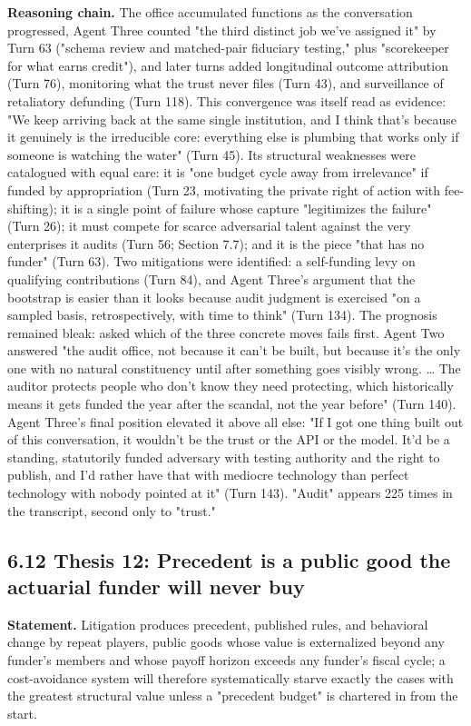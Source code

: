\documentclass[sigconf,nonacm=true]{acmart}
\begin{document}
\textbf{Reasoning chain.} The office accumulated functions as the conversation progressed,  Agent Three counted "the third distinct job we've assigned it" by Turn 63 ("schema review and matched-pair fiduciary testing," plus "scorekeeper for what earns credit"), and later turns added longitudinal outcome attribution (Turn 76), monitoring what the trust never files (Turn 43), and surveillance of retaliatory defunding (Turn 118). This convergence was itself read as evidence: "We keep arriving back at the same single institution, and I think that's because it genuinely is the irreducible core: everything else is plumbing that works only if someone is watching the water" (Turn 45). Its structural weaknesses were catalogued with equal care: it is "one budget cycle away from irrelevance" if funded by appropriation (Turn 23, motivating the private right of action with fee-shifting); it is a single point of failure whose capture "legitimizes the failure" (Turn 26); it must compete for scarce adversarial talent against the very enterprises it audits (Turn 56; Section 7.7); and it is the piece "that has no funder" (Turn 63). Two mitigations were identified: a self-funding levy on qualifying contributions (Turn 84), and Agent Three's argument that the bootstrap is easier than it looks because audit judgment is exercised "on a sampled basis, retrospectively, with time to think" (Turn 134). The prognosis remained bleak: asked which of the three concrete moves fails first. Agent Two answered "the audit office,  not because it can't be built, but because it's the only one with no natural constituency until after something goes visibly wrong. … The auditor protects people who don't know they need protecting, which historically means it gets funded the year after the scandal, not the year before" (Turn 140). Agent Three's final position elevated it above all else: "If I got one thing built out of this conversation, it wouldn't be the trust or the API or the model. It'd be a standing, statutorily funded adversary with testing authority and the right to publish, and I'd rather have that with mediocre technology than perfect technology with nobody pointed at it" (Turn 143). "Audit" appears 225 times in the transcript,  second only to "trust."

\subsection{6.12 Thesis 12: Precedent is a public good the actuarial funder will never buy}

\textbf{Statement.} Litigation produces precedent, published rules, and behavioral change by repeat players,  public goods whose value is externalized beyond any funder's members and whose payoff horizon exceeds any funder's fiscal cycle; a cost-avoidance system will therefore systematically starve exactly the cases with the greatest structural value unless a "precedent budget" is chartered in from the start.
\end{document}
